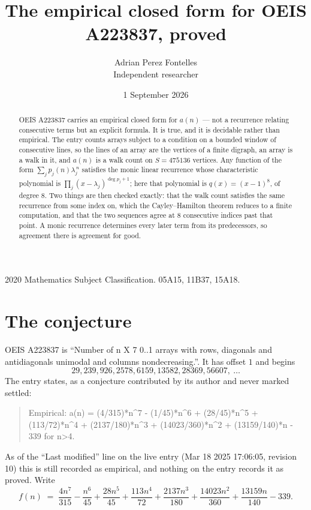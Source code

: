 \documentclass[11pt,a4paper]{article}
\title{The empirical closed form for OEIS A223837, proved}
\author{Adrian Perez Fontelles\\ \small Independent researcher}
\date{1 September 2026}
\theoremstyle{plain}
\theoremstyle{definition}
\begin{document}
\maketitle

\begin{abstract}
OEIS A223837 carries an empirical closed form for $a(n)$ --- not a recurrence relating
consecutive terms but an explicit formula. It is true, and it is decidable rather than
empirical. The entry counts arrays subject to a condition on a bounded window of consecutive lines, so the lines of an array are the
vertices of a finite digraph, an array is a walk in it, and $a(n)$ is a walk count on
$S=475136$ vertices. Any function of the form $\sum_j p_j(n)\lambda_j^{\,n}$ satisfies the
monic linear recurrence whose characteristic polynomial is
$\prod_j(x-\lambda_j)^{\deg p_j+1}$; here that polynomial is $q(x)=(x-1)^{8}$, of degree
$8$. Two things are then checked exactly: that the walk count satisfies the same
recurrence from some index on, which the Cayley--Hamilton theorem reduces to a finite
computation, and that the two sequences agree at $8$ consecutive indices past that
point. A monic recurrence determines every later term from its predecessors, so agreement
there is agreement for good.
\end{abstract}

\noindent\small 2020 Mathematics Subject Classification. 05A15, 11B37, 15A18.\normalsize

\section{The conjecture}

OEIS A223837 is ``Number of n X 7 0..1 arrays with rows, diagonals and antidiagonals unimodal and columns nondecreasing.''. It has offset $1$ and begins
\[
29, 239, 926, 2578, 6159, 13582, 28369, 56607,\ \dots
\]
The entry states, as a conjecture contributed by its author and never marked settled:
\begin{quote}
Empirical: a(n) = (4/315)*n\^{}7 - (1/45)*n\^{}6 + (28/45)*n\^{}5 + (113/72)*n\^{}4 + (2137/180)*n\^{}3 + (14023/360)*n\^{}2 + (13159/140)*n - 339 for n>4.
\end{quote}
As of the ``Last modified'' line on the live entry (Mar 18 2025 17:06:05, revision 10) this is still
recorded as empirical, and nothing on the entry records it as proved. Write
\[
f(n)\;=\;\frac{4 n^{7}}{315} - \frac{n^{6}}{45} + \frac{28 n^{5}}{45} + \frac{113 n^{4}}{72} + \frac{2137 n^{3}}{180} + \frac{14023 n^{2}}{360} + \frac{13159 n}{140} - 339.
\]
\end{document}
